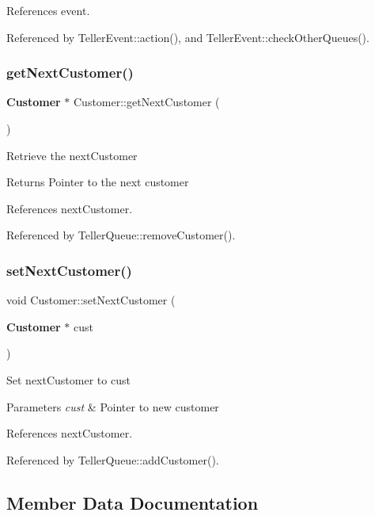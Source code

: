 References event.



Referenced by Teller\+Event\+::action(), and Teller\+Event\+::check\+Other\+Queues().

\mbox{\label{classCustomer_ae0e584d36211fad18ef0a99c828cec69}} 
\subsubsection{get\+Next\+Customer()}
{\footnotesize\ttfamily \textbf{ Customer} $\ast$ Customer\+::get\+Next\+Customer (\begin{DoxyParamCaption}{ }\end{DoxyParamCaption})}

Retrieve the next\+Customer \begin{DoxyReturn}{Returns}
Pointer to the next customer 
\end{DoxyReturn}


References next\+Customer.



Referenced by Teller\+Queue\+::remove\+Customer().

\mbox{\label{classCustomer_a677e901e3693e63519f03b08c0348f20}} 
\subsubsection{set\+Next\+Customer()}
{\footnotesize\ttfamily void Customer\+::set\+Next\+Customer (\begin{DoxyParamCaption}\item[{\textbf{ Customer} $\ast$}]{cust }\end{DoxyParamCaption})}

Set next\+Customer to cust 
\begin{DoxyParams}{Parameters}
{\em cust} & Pointer to new customer \\
\hline
\end{DoxyParams}


References next\+Customer.



Referenced by Teller\+Queue\+::add\+Customer().



\subsection{Member Data Documentation}
\mbox{\label{classCustomer_a671c01359a83ebbe7dfa31c796a1e766}} 
